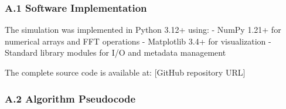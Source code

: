 \documentclass[
  11pt,
]{article}
\begin{document}
\subsubsection{A.1 Software
Implementation}\label{a.1-software-implementation}

The simulation was implemented in Python 3.12+ using: - NumPy 1.21+ for
numerical arrays and FFT operations - Matplotlib 3.4+ for visualization
- Standard library modules for I/O and metadata management

The complete source code is available at: {[}GitHub repository URL{]}

\subsubsection{A.2 Algorithm Pseudocode}\label{a.2-algorithm-pseudocode}
\end{document}
